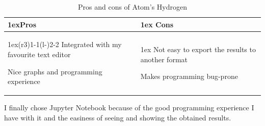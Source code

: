 \documentclass{article}
\begin{document}
    \begin{table}[H]
    \begin{tabularx}{\linewidth}{>{\parskip1ex}X@{\kern4\tabcolsep}>{\parskip1ex}X}
    \toprule
    \hfil\bfseries Pros
    &
    \hfil\bfseries Cons
    \\\cmidrule(r{3\tabcolsep}){1-1}\cmidrule(l{-\tabcolsep}){2-2}
    Integrated with my favourite text editor\par
    Nice graphs and programming experience\par
    &
    Not easy to export the results to another format\par
    Makes programming bug-prone\par
    \\\bottomrule
    \end{tabularx}
    \caption{Pros and cons of Atom's Hydrogen}
    \end{table}

    I finally chose Jupyter Notebook because of the good programming experience
    I have with it and the easiness of seeing and showing the obtained results.
\end{document}
